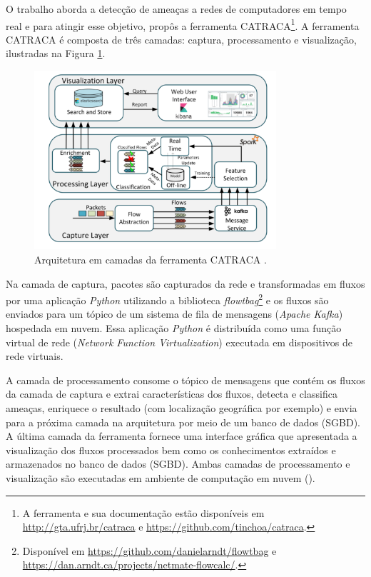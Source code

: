 O trabalho  aborda a detecção de ameaças a redes de
computadores em tempo real e para atingir esse objetivo, propôs a ferramenta
CATRACA\footnote{
    A ferramenta e sua documentação estão disponíveis em \url{http://gta.ufrj.br/catraca}
    e \url{https://github.com/tinchoa/catraca}.
}.
A ferramenta CATRACA é composta de três camadas: captura, processamento e
visualização, ilustradas na Figura \ref{fig:catraca}.

\begin{figure}[ht]
\centering
\includegraphics[width=0.8\textwidth]{figuras/catraca-arch.png}
\caption{Arquitetura em camadas da ferramenta CATRACA \cite{Lopez2018}.}
\label{fig:catraca}
\end{figure}


Na camada de captura, pacotes são capturados da rede e transformadas em fluxos
por uma aplicação \emph{Python} utilizando a biblioteca \emph{flowtbag}\footnote{
    Disponível em \url{https://github.com/danielarndt/flowtbag} e
    \url{https://dan.arndt.ca/projects/netmate-flowcalc/}.
}
e os fluxos são enviados para um tópico de um sistema de fila de mensagens
(\emph{Apache Kafka}) hospedada em nuvem.
Essa aplicação \emph{Python} é distribuída como uma função virtual de rede
(\emph{Network Function Virtualization}) executada em dispositivos de rede
virtuais.

A camada de processamento consome o tópico de mensagens que contém os fluxos
da camada de captura e extrai características dos fluxos, detecta e classifica ameaças,
enriquece o resultado (com localização geográfica por exemplo) e envia para a
próxima camada na arquitetura por meio de um banco de dados (SGBD).
A última camada da ferramenta fornece uma interface gráfica que apresentada a
visualização dos fluxos processados bem como os conhecimentos extraídos e
armazenados no banco de dados (SGBD).
Ambas camadas de processamento e visualização são executadas em ambiente de
computação em nuvem (\cloud).

